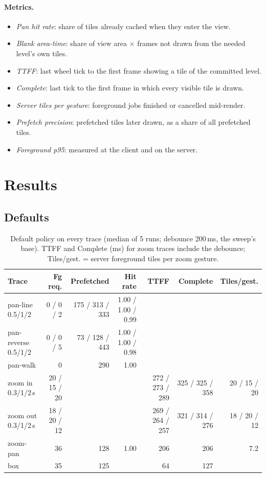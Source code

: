 \documentclass[11pt,a4paper]{article}
\begin{document}
\paragraph{Metrics.}
\begin{itemize}
  \item \emph{Pan hit rate}: share of tiles already cached when they enter the view.
  \item \emph{Blank area-time}: share of view area $\times$ frames not drawn from the needed level's own tiles.
  \item \emph{TTFF}: last wheel tick to the first frame showing a tile of the committed level.
  \item \emph{Complete}: last tick to the first frame in which every visible tile is drawn.
  \item \emph{Server tiles per gesture}: foreground jobs finished or cancelled mid-render.
  \item \emph{Prefetch precision}: prefetched tiles later drawn, as a share of all prefetched tiles.
  \item \emph{Foreground p95}: measured at the client and on the server.
\end{itemize}

\section{Results}
\subsection{Defaults}
\begin{table}[!htbp]
\centering\small
\caption{Default policy on every trace (median of 5 runs; debounce 200\,ms, the sweep's base). TTFF and Complete
(ms) for zoom traces include the debounce; Tiles/gest. = server foreground tiles per zoom gesture.}
\label{tab:base}
\footnotesize\setlength{\tabcolsep}{2pt}
\begin{tabular*}{\linewidth}{@{\extracolsep{\fill}}lrrrrrr}
\toprule
Trace & Fg req. & Prefetched & Hit rate & TTFF & Complete & Tiles/gest. \\
\midrule
pan-line 0.5/1/2 & 0 / 0 / 2 & 175 / 313 / 333 & 1.00 / 1.00 / 0.99 & & & \\
pan-reverse 0.5/1/2 & 0 / 0 / 5 & 73 / 128 / 443 & 1.00 / 1.00 / 0.98 & & & \\
pan-walk & 0 & 290 & 1.00 & & & \\
zoom in 0.3/1/2\,s & 20 / 15 / 20 & & & 272 / 273 / 289 & 325 / 325 / 358 & 20 / 15 / 20 \\
zoom out 0.3/1/2\,s & 18 / 20 / 12 & & & 269 / 264 / 257 & 321 / 314 / 276 & 18 / 20 / 12 \\
zoom-pan & 36 & 128 & 1.00 & 206 & 206 & 7.2 \\
box & 35 & 125 & & 64 & 127 & \\
\bottomrule
\end{tabular*}
\end{table}
\end{document}
